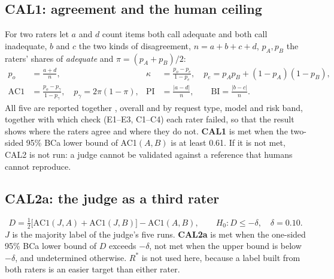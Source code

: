 \subsection{CAL1: agreement and the human ceiling}
For two raters let $a$ and $d$ count items both call adequate and both call inadequate, $b$ and $c$ the two kinds of disagreement, $n=a+b+c+d$, $p_A,p_B$ the raters' shares of \emph{adequate} and $\pi=(p_A+p_B)/2$:
\begin{align}
p_o &= \frac{a+d}{n}, &
\kappa &= \frac{p_o-p_e}{1-p_e},\quad p_e=p_Ap_B+(1-p_A)(1-p_B), \\
\mathrm{AC1} &= \frac{p_o-p_\gamma}{1-p_\gamma},\quad p_\gamma=2\pi(1-\pi), &
\mathrm{PI} &= \frac{|a-d|}{n},\qquad \mathrm{BI}=\frac{|b-c|}{n}.
\end{align}
All five are reported together \citep{landiskoch,feinstein,gwet}, overall and by request type, model and risk band, together with which check (E1--E3, C1--C4) each rater failed, so that the result shows where the raters agree and where they do not. \textbf{CAL1} is met when the two-sided 95\% BCa lower bound of AC1$(A,B)$ is at least 0.61. If it is not met, CAL2 is not run: a judge cannot be validated against a reference that humans cannot reproduce.

\subsection{CAL2a: the judge as a third rater}
\begin{equation}
D=\tfrac12\bigl[\mathrm{AC1}(J,A)+\mathrm{AC1}(J,B)\bigr]-\mathrm{AC1}(A,B),\qquad H_0: D\le-\delta,\quad \delta=0.10 .
\end{equation}
$J$ is the majority label of the judge's five runs. \textbf{CAL2a} is met when the one-sided 95\% BCa lower bound of $D$ exceeds $-\delta$, not met when the upper bound is below $-\delta$, and undetermined otherwise. $R^{*}$ is not used here, because a label built from both raters is an easier target than either rater.

